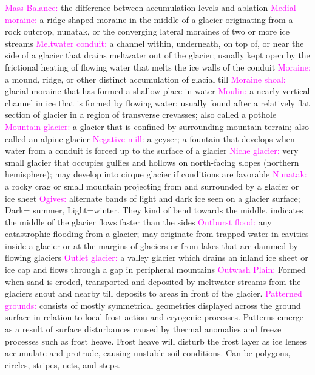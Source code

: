 \documentclass{article}
\newcommand{\pink}[1]{\textcolor{magenta}{#1}}
\newcommand{\vocab}[1]{{\pink{#1}}}
\begin{document}
\begin{multicols*}{4}
		\vocab{Mass Balance: } the difference between accumulation levels and ablation  
		\vocab{        Medial moraine: } a ridge-shaped moraine in the middle of a glacier originating from a rock outcrop, nunatak, or the converging lateral moraines of two or more ice streams 
		\vocab{        Meltwater conduit: } a channel within, underneath, on top of, or near the side of a glacier that drains meltwater out of the glacier; usually kept open by the frictional heating of flowing water that melts the ice walls of the conduit 
		\vocab{        Moraine: } a mound, ridge, or other distinct accumulation of glacial till 
		\vocab{        Moraine shoal: } glacial moraine that has formed a shallow place in water 
		\vocab{        Moulin: } a nearly vertical channel in ice that is formed by flowing water; usually found after a relatively flat section of glacier in a region of transverse crevasses; also called a pothole 
		\vocab{        Mountain glacier: } a glacier that is confined by surrounding mountain terrain; also called an alpine glacier 
		\vocab{        Negative mill: } a geyser; a fountain that develops when water from a conduit is forced up to the surface of a glacier 
		\vocab{        Niche glacier: } very small glacier that occupies gullies and hollows on north-facing slopes (northern hemisphere); may develop into cirque glacier if conditions are favorable 
		\vocab{        Nunatak: } a rocky crag or small mountain projecting from and surrounded by a glacier or ice sheet 
		\vocab{        Ogives: } alternate bands of light and dark ice seen on a glacier surface; Dark= summer, Light=winter. They kind of bend towards the middle. {indicates the middle of the glacier flows faster than the sides} 
		\vocab{        Outburst flood: } any catastrophic flooding from a glacier; may originate from trapped water in cavities inside a glacier or at the margins of glaciers or from lakes that are dammed by flowing glaciers 
		\vocab{        Outlet glacier: } a valley glacier which drains an inland ice sheet or ice cap and flows through a gap in peripheral mountains 
		\vocab{Outwash Plain: } Formed when sand is eroded, transported and deposited by meltwater streams from the glaciers snout and nearby till deposits to areas in front of the glacier.  
		\vocab{        Patterned grounds: } consists of mostly symmetrical geometries displayed across the ground surface in relation to local frost action and cryogenic processes. Patterns emerge as a result of surface disturbances caused by thermal anomalies and freeze processes such as frost heave. Frost heave will disturb the frost layer as ice lenses accumulate and protrude, causing unstable soil conditions. Can be polygons, circles, stripes, nets, and steps.  

\end{multicols*}
\end{document}
